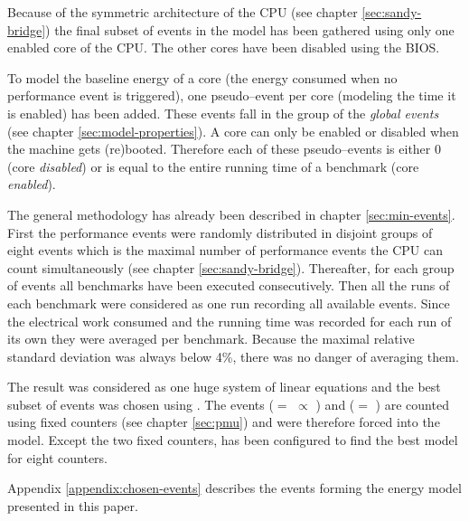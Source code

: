 Because of the symmetric architecture of the CPU (see chapter
\ref{sec:sandy-bridge}) the final subset of events in the model has been
gathered using only one enabled core of the CPU. The other cores have been
disabled using the BIOS.

To model the baseline energy of a core (the energy consumed when no performance
event is triggered), one pseudo--event per core (modeling the time it is
enabled) has been added. These events fall in the group of the \emph{global
events} (see chapter \ref{sec:model-properties}). A core can only be enabled or
disabled when the machine gets (re)booted. Therefore each of these
pseudo--events is either $0$ (core \emph{disabled}) or is equal to the entire
running time of a benchmark (core \emph{enabled}).

The general methodology has already been described in chapter
\ref{sec:min-events}.  First the performance events were randomly
distributed in disjoint groups of eight events which is the maximal number of
performance events the CPU can count simultaneously (see chapter
\ref{sec:sandy-bridge}). Thereafter, for each group of events all benchmarks
have been executed consecutively. Then all the runs of each benchmark were
considered as one run recording all available events. Since the electrical
work consumed and the running time was recorded for each run of its own they
were averaged per benchmark. Because the maximal relative standard deviation
was always below 4\%, there was no danger of averaging them.

The result was considered as one huge system of linear equations and the best
subset of events was chosen using \JWTleaps{}. The events \JWctrCLK{} ($=$
 $\propto$
) and \JWctrINST{} ($=$
) are counted using fixed counters (see chapter
\ref{sec:pmu}) and were therefore forced into the model. Except the two fixed
counters, \JWTleaps{} has been configured to find the best model for eight
counters.

Appendix \ref{appendix:chosen-events} describes the events forming the energy
model presented in this paper.


\label{sec:final-model}

